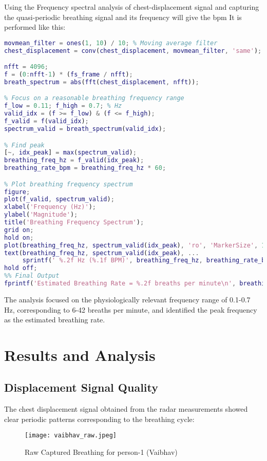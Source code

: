 \documentclass[12pt]{article}
\begin{document}
Using the Frequency spectral analysis of chest-displacement signal and capturing the quasi-periodic breathing signal and its frequency will give the bpm It is performed like this:

\begin{lstlisting}[language=Matlab]
%% Step 6: FFT for breathing rate estimation
movmean_filter = ones(1, 10) / 10; % Moving average filter
chest_displacement = conv(chest_displacement, movmean_filter, 'same');

nfft = 4096;
f = (0:nfft-1) * (fs_frame / nfft);
breath_spectrum = abs(fft(chest_displacement, nfft));

% Focus on a reasonable breathing frequency range
f_low = 0.11; f_high = 0.7; % Hz
valid_idx = (f >= f_low) & (f <= f_high);
f_valid = f(valid_idx);
spectrum_valid = breath_spectrum(valid_idx);

% Find peak
[~, idx_peak] = max(spectrum_valid);
breathing_freq_hz = f_valid(idx_peak);
breathing_rate_bpm = breathing_freq_hz * 60;

% Plot breathing frequency spectrum
figure;
plot(f_valid, spectrum_valid);
xlabel('Frequency (Hz)');
ylabel('Magnitude');
title('Breathing Frequency Spectrum');
grid on;
hold on;
plot(breathing_freq_hz, spectrum_valid(idx_peak), 'ro', 'MarkerSize', 10);
text(breathing_freq_hz, spectrum_valid(idx_peak), ...
     sprintf(' %.2f Hz (%.1f BPM)', breathing_freq_hz, breathing_rate_bpm));
hold off;
%% Final Output
fprintf('Estimated Breathing Rate = %.2f breaths per minute\n', breathing_rate_bpm);
\end{lstlisting}

The analysis focused on the physiologically relevant frequency range of 0.1-0.7 Hz, corresponding to 6-42 breaths per minute, and identified the peak frequency as the estimated breathing rate.

\section{Results and Analysis}

\subsection{Displacement Signal Quality}
The chest displacement signal obtained from the radar measurements showed clear periodic patterns corresponding to the breathing cycle:

\begin{figure}[H]
\centering
\texttt{[image: vaibhav\_raw.jpeg]} %
\caption{Raw Captured Breathing for person-1 (Vaibhav)}
\end{figure}
\end{document}
